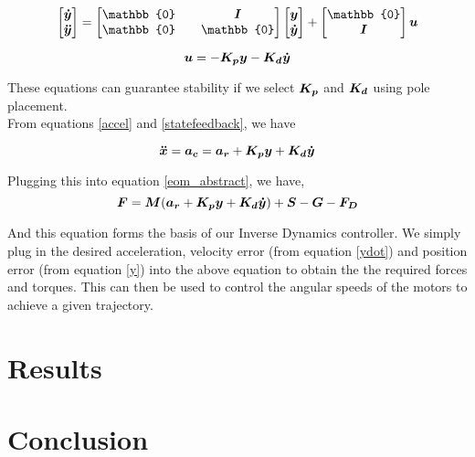 \documentclass[12pt,fleqn]{article}
\newcommand{\mbm}[1]{\mbox{\boldmath $#1$}}
\begin{document}
\begin{equation} \label{y_dynamics}
$$ \begin{bmatrix} \mbm{\dot{y}} \\ \mbm{\ddot{y}} \end{bmatrix}
= \begin{bmatrix} \mathbb{0} && \mbm{I} \\ \mathbb{0} &&
  \mathbb{0} \end{bmatrix} \begin{bmatrix} \mbm{y} \\
  \mbm{\dot{y}}\end{bmatrix} + \begin{bmatrix} \mathbb{0}  \\
  \mbm{I} \end{bmatrix} \mbm{u}$$
\end{equation}

\begin{equation} \label{statefeedback}
$$ \mbm{u} = -\mbm{K_p}\mbm{y} - \mbm{K_d}\mbm{\dot{y}} $$
\end{equation}

These equations can guarantee stability if we select $\mbm{K_p}$ and
$\mbm{K_d}$ using pole placement.\\

From equations \ref{accel} and \ref{statefeedback}, we have

$$ \mbm{\ddot{x}} = \mbm{a_c} = \mbm{a_r} + \mbm{K_p}\mbm{y} +
\mbm{K_d}\mbm{\dot{y}} $$

Plugging this into equation \ref{eom_abstract}, we have,
\begin{equation} \label{eom_id}
$$ \mbm{F} = \mbm{M}(\mbm{a_r} + \mbm{K_p}\mbm{y} +
\mbm{K_d}\mbm{\dot{y}}) + \mbm{S} -\mbm{G} - \mbm{F_D} $$
\end{equation}

And this equation forms the basis of our Inverse Dynamics
controller. We simply plug in the desired acceleration, velocity error
(from equation \ref{ydot}) and position error (from
equation \ref{y}) into the above equation to obtain the the required
forces and torques. This can then be used to control the angular
speeds of the motors to achieve a given trajectory. 


\section{Results}

\section{Conclusion}




\end{document}
